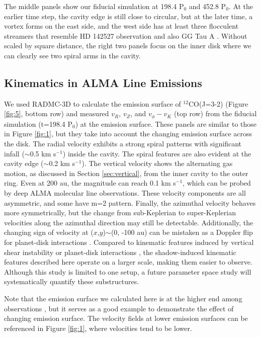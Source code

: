 \documentclass[twocolumn,tighten]{aastex631}
\begin{document}
The middle panels show our fiducial simulation at 198.4 P$_0$ and 452.8 P$_0$. At the earlier time step, the cavity edge is still close to circular, but at the later time, a vortex forms on the east side, and the west side has at least three flocculent streamers that resemble HD 142527 observation and also GG Tau A \citep{keppler20}. Without scaled by square distance, the right two panels focus on the inner disk where we can clearly see two spiral arms in the cavity.

\subsection{Kinematics in ALMA Line Emissions} \label{sec:kinematics}

We used RADMC-3D to calculate the emission surface of $^{12}$CO(J=3-2) (Figure \ref{fig:5}, bottom row) and measured $v_R$, $v_Z$, and $v_\phi - v_K$ (top row) from the fiducial simulation (t=198.4 P$_0$) at the emission surface. These panels are similar to those in Figure \ref{fig:1}, but they take into account the changing emission surface across the disk. The radial velocity exhibits a strong spiral patterns with significant infall ($\sim$0.5 km s$^{-1}$) inside the cavity. The spiral features are also evident at the cavity edge ($\sim$0.2 km s$^{-1}$). The vertical velocity shows the alternating gas motion, as discussed in Section \ref{sec:vertical}, from the inner cavity to the outer ring. Even at 200 au, the magnitude can reach 0.1 km s$^{-1}$, which can be probed by deep ALMA molecular line observations. These velocity components are all asymmetric, and some have m=2 pattern. Finally, the azimuthal velocity behaves more symmetrically, but the change from sub-Keplerian to super-Keplerian velocities along the azimuthal direction may still be detectable. Additionally, the changing sign of velocity at ($x$,$y$)$\sim$(0,  -100 au) can be mistaken as a Doppler flip for planet-disk interactions \citep{casassus19}. Compared to kinematic features induced by vertical shear instability or planet-disk interactions \citep[e.g.,][]{barraza-alfaro24}, the shadow-induced kinematic features described here operate on a larger scale, making them easier to observe. Although this study is limited to one setup, a future parameter space study will systematically quantify these substructures.

Note that the emission surface we calculated here is at the higher end among observations \citep[e.g.,][]{law23}, but it serves as a good example to demonstrate the effect of changing emission surface. The velocity fields at lower emission surfaces can be referenced in Figure \ref{fig:1}, where velocities tend to be lower.
\end{document}
